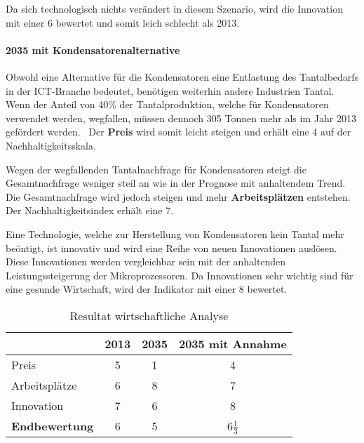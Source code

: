 Da sich technologisch nichts verändert in diesem Szenario, wird die Innovation mit einer 6 bewertet und somit leich schlecht als 2013.

\paragraph{2035 mit Kondensatorenalternative}
Obwohl eine Alternative für die Kondensatoren eine Entlastung des Tantalbedarfs in der ICT-Branche bedeutet, benötigen weiterhin andere Industrien Tantal. Wenn der Anteil von 40\% der Tantalproduktion, welche für Kondensatoren verwendet werden, wegfallen, müssen dennoch 305 Tonnen mehr als im Jahr 2013 gefördert werden.~\cite{tantal_price2} Der \textbf{Preis} wird somit leicht steigen und erhält eine 4 auf der Nachhaltigkeitsskala.

Wegen der wegfallenden Tantalnachfrage für Kondensatoren steigt die Gesamtnachfrage weniger steil an wie in der Prognose mit anhaltendem Trend. Die Gesamtnachfrage wird jedoch steigen und mehr \textbf{Arbeitsplätzen} entstehen. Der Nachhaltigkeitsindex erhält eine 7.

Eine Technologie, welche zur Herstellung von Kondensatoren kein Tantal mehr beöntigt, ist innovativ und wird eine Reihe von neuen Innovationen auslösen. Diese Innovationen werden vergleichbar sein mit der anhaltenden Leistungssteigerung der Mikroprozessoren. Da Innovationen sehr wichtig sind für eine gesunde Wirtschaft, wird der Indikator mit einer 8 bewertet.

\begin{table}[h]
  \centering
  \begin{tabular}{l|ccc}            & \textbf{2013} & \textbf{2035} & \textbf{2035 mit Annahme}
    \\ \hline Preis                 & 5             & 1             & 4
    \\ Arbeitsplätze                & 6             & 8             & 7
    \\ Innovation                   & 7             & 6             & 8
    \\ \hline \textbf{Endbewertung} & 6             & 5             & 6\(\frac{1}{3}\)
  \end{tabular}
  \caption{Resultat wirtschaftliche Analyse}
\end{table}
